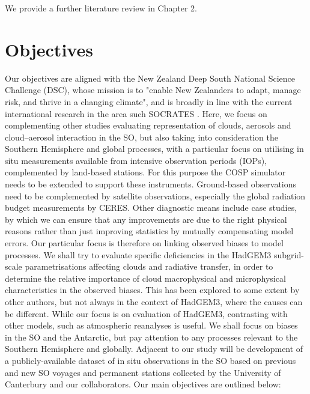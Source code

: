 We provide a further literature review in Chapter 2.

\section{Objectives}
\label{sec:1:objectives}

Our objectives are aligned with the New Zealand Deep South National
Science Challenge (DSC), whose mission is to "enable New Zealanders to adapt,
manage risk, and thrive in a changing climate", and is
broadly in line with the current international research in the area
such SOCRATES \citep{mcfarquhar2014}.
Here, we focus on complementing other studies evaluating
representation of clouds, aerosols and cloud--aerosol interaction in the SO,
but also taking into consideration the Southern Hemisphere and global processes,
with a particular focus on utilising in situ measurements
available from intensive observation periods (IOPs), complemented by land-based
stations. For this
purpose the COSP simulator needs to be extended to support these
instruments. Ground-based observations need to be
complemented by satellite observations, especially the global radiation budget
measurements by CERES.
Other diagnostic means include
case studies, by which we can ensure that any improvements are due to
the right physical reasons rather than just improving statistics by mutually
compensating model errors. Our particular focus is therefore on linking
observed biases to model processes. 
We shall try to evaluate specific deficiencies in the HadGEM3 subgrid-scale
parametrisations affecting clouds and radiative transfer, in order to
determine the relative importance of cloud macrophysical and microphysical
characteristics in the observed biases. This has been explored to some extent
by other authors, but not always in the context of HadGEM3,
where the causes can be different.
While our focus is on evaluation of HadGEM3, contrasting with other
models, such as atmospheric reanalyses is useful.
We shall focus on biases in the SO and the
Antarctic, but pay attention to any processes relevant to the Southern
Hemisphere and globally.
Adjacent to our study will be development of a publicly-available dataset
of in situ observations in the SO based on previous and new SO voyages
and permanent stations collected by the University of Canterbury and our
collaborators.
Our main objectives are outlined below:


